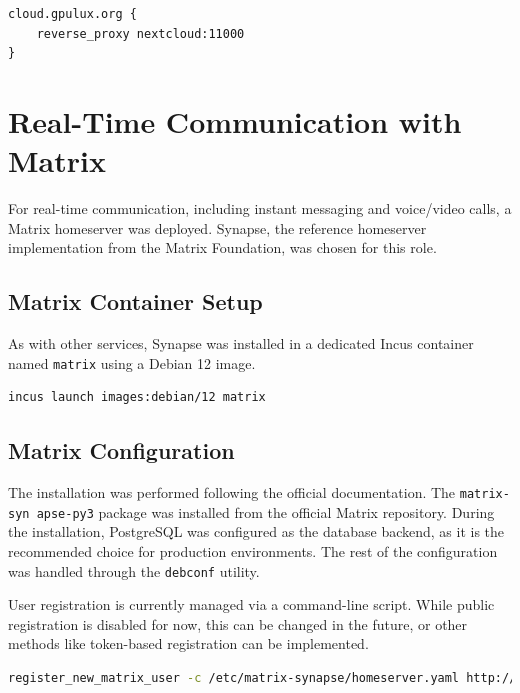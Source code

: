 \begin{lstlisting}[caption={Caddyfile configuration to reverse proxy Nextcloud.}]
cloud.gpulux.org {
    reverse_proxy nextcloud:11000
}
\end{lstlisting}

\section{Real-Time Communication with Matrix}

For real-time communication, including instant messaging and voice/video calls, a Matrix\cite{matrix-docs} homeserver was deployed. Synapse, the reference homeserver implementation from the Matrix Foundation, was chosen for this role.

\subsection*{Matrix Container Setup}

As with other services, Synapse was installed in a dedicated Incus container named \texttt{matrix} using a Debian 12 image.

\begin{lstlisting}[language=bash,caption={Creating the Matrix container.}]
incus launch images:debian/12 matrix
\end{lstlisting}

\subsection*{Matrix Configuration}

The installation was performed following the official documentation\cite{synapse-install-debian}. The \texttt{matrix-syn apse-py3} package was installed from the official Matrix repository. During the installation, PostgreSQL was configured as the database backend, as it is the recommended choice for production environments. The rest of the configuration was handled through the \texttt{debconf} utility.

User registration is currently managed via a command-line script. While public registration is disabled for now, this can be changed in the future, or other methods like token-based registration can be implemented.

\begin{lstlisting}[language=bash,caption={Command to register a new Matrix user.}]
register_new_matrix_user -c /etc/matrix-synapse/homeserver.yaml http://localhost:8008
\end{lstlisting}

